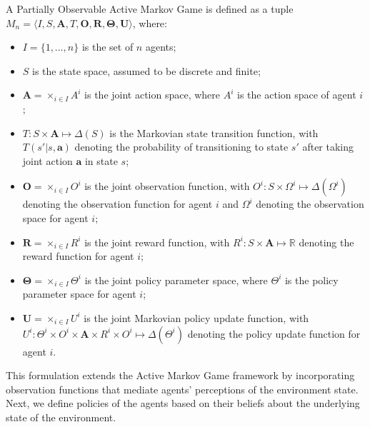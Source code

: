 \begin{definition}
    A Partially Observable Active Markov Game is defined as a tuple $M_n = \langle I, S, \boldsymbol{A}, T, \boldsymbol{O}, \boldsymbol{R}, \boldsymbol{\Theta}, \boldsymbol{U} \rangle$, where:
    \begin{itemize}
        \item $I = \{1, \ldots, n\}$ is the set of $n$ agents;
        \item $S$ is the state space, assumed to be discrete and finite;
        \item $\boldsymbol{A} = \times_{i \in I} A^i$ is the joint action space, where $A^i$ is the action space of agent $i$;
        \item $T: S \times \boldsymbol{A} \mapsto \Delta(S)$ is the Markovian state transition function, with $T(s'|s, \boldsymbol{a})$ denoting the probability of transitioning to state $s'$ after taking joint action $\boldsymbol{a}$ in state $s$;
        \item $\boldsymbol{O} = \times_{i \in I} O^i$ is the joint observation function, with $O^i: S \times \Omega^i \mapsto \Delta(\Omega^i)$ denoting the observation function for agent $i$ and $\Omega^i$ denoting the observation space for agent $i$;
        \item $\boldsymbol{R} = \times_{i \in I} R^i$ is the joint reward function, with $R^i: S \times \boldsymbol{A} \mapsto \mathbb{R}$ denoting the reward function for agent $i$;
        \item $\boldsymbol{\Theta} = \times_{i \in I} \Theta^i$ is the joint policy parameter space, where $\Theta^i$ is the policy parameter space for agent $i$;
        \item $\boldsymbol{U} = \times_{i \in I} U^i$ is the joint Markovian policy update function, with
              $U^i: \Theta^i \times O^i \times \boldsymbol{A} \times R^i \times O^i \mapsto \Delta(\Theta^i)$ denoting the policy update function for agent $i$.
    \end{itemize}
\end{definition}
This formulation extends the Active Markov Game framework by incorporating observation functions that mediate agents' perceptions of the environment state. Next, we define policies of the agents based on their beliefs about the underlying state of the environment.

